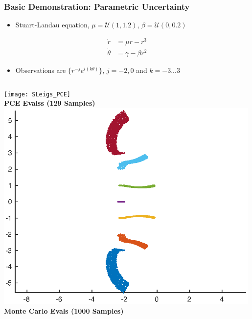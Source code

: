 \documentclass[9pt]{beamer}
\begin{document}
\begin{frame}
\frametitle{Basic Demonstration: Parametric Uncertainty}
\label{sec-3-2}

\begin{itemize}
\item Stuart-Landau equation, $\mu = \mathcal{U}(1,1.2)$, $\beta = \mathcal{U}(0,0.2)$
\end{itemize}
\begin{equation*}
\begin{aligned}
\dot{r} &= \mu r - r^3 \\
\dot{\theta} &= \gamma - \beta r^2
\end{aligned}
\end{equation*}
\begin{itemize}
\item Observations are $\lbrace r^{-j} e^{i(k\theta)} \rbrace$, $j = -2,0$ and $k = -3...3$
\end{itemize}

\begin{columns}[c]
    \centering
    \texttt{[image: SLeigs\_PCE]} \\
    {\bf PCE Evalss (129 Samples)}
    \centering
    \includegraphics[width=0.99\textwidth]{SLeigs_MC} \\
    {\bf Monte Carlo Evals (1000 Samples)}
\end{columns}
\end{frame}
\end{document}
